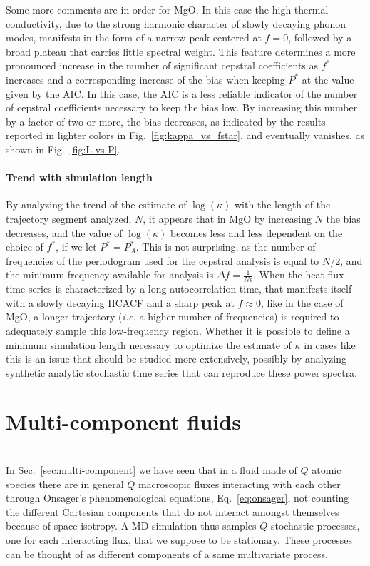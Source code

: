 Some more comments are in order for MgO. In this case the high thermal conductivity, due to the strong harmonic character of slowly decaying phonon modes, manifests in the form of a narrow peak centered at $f=0$, followed by a broad plateau that carries little spectral weight. This feature determines a more pronounced increase in the number of significant cepstral coefficients as $f^*$ increases and a corresponding increase of the bias when keeping $P^*$ at the value given by the AIC. In this case, the AIC is a less reliable indicator of the number of cepstral coefficients necessary to keep the bias low. By increasing this number by a factor of two or more, the bias decreases, as indicated by the results reported in lighter colors in Fig.~\ref{fig:kappa_vs_fstar}, and eventually vanishes, as shown in Fig.~\ref{fig:L-vs-P}.

\begin{LEtext}
\paragraph{Trend with simulation length}
By analyzing the trend of the estimate of $\log(\kappa)$ with the length of the trajectory segment analyzed, $N$, it appears that in MgO by increasing $N$ the bias decreases, and the value of $\log(\kappa)$ becomes less and less dependent on the choice of $f^*$, if we let $P^*=P_A^*$. This is not surprising, as the number of frequencies of the periodogram used for the cepstral analysis is equal to $N/2$, and the minimum frequency available for analysis is $\Delta f = \frac{1}{N\epsilon}$. When the heat flux time series is characterized by a long autocorrelation time, that manifests itself with a slowly decaying HCACF and a sharp peak at $f\approx 0$, like in the case of MgO, a longer trajectory (\emph{i.e.} a higher number of frequencies) is required to adequately sample this low-frequency region. 
Whether it is possible to define a minimum simulation length necessary to optimize the estimate of $\kappa$ in cases like this is an issue that should be studied more extensively, possibly by analyzing synthetic analytic stochastic time series that can reproduce these power spectra.
\end{LEtext}


\section{Multi-component fluids}  \label{sec:data-analysis-multicomponent}
\\
In Sec.~\ref{sec:multi-component} we have seen that in a fluid made of $Q$ atomic species there are in general $Q$ macroscopic fluxes interacting with each other through Onsager's phenomenological equations, Eq.~\eqref{eq:onsager}, not counting the different Cartesian components that do not interact amongst themselves because of space isotropy. A MD simulation thus samples $Q$ stochastic processes, one for each interacting flux, that we suppose to be stationary. These processes can be thought of as different components of a same multivariate process. 

